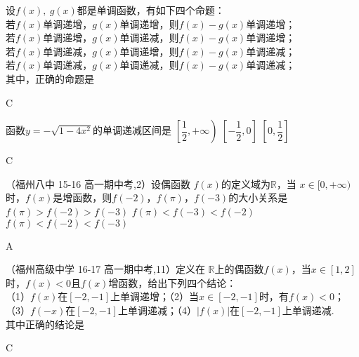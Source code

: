   \begin{exercise}
    \item
      设$f(x),\ g(x)$都是单调函数，有如下四个命题：\\
      若$f(x)$单调递增，$g(x)$单调递增，则$f(x)-g(x)$单调递增；\\
      若$f(x)$单调递增，$g(x)$单调递减，则$f(x)-g(x)$单调递增；\\
      若$f(x)$单调递减，$g(x)$单调递增，则$f(x)-g(x)$单调递减；\\
      若$f(x)$单调递减，$g(x)$单调递减，则$f(x)-g(x)$单调递减；\\
      其中，正确的命题是\xz
      \begin{answer}
        C
      \end{answer}
    \item
      函数$y=-\sqrt{1-4x^2}$的单调递减区间是\xz
      \xx{$\left(-\infty,\dfrac{1}2\right]$}
        {$\left[\dfrac{1}2,+\infty\right)$}
        {$\left[-\dfrac{1}2,0\right]$}
        {$\left[0,\dfrac{1}2\right]$}
      \begin{answer}
        C
      \end{answer}
    \item
      （福州八中 15-16 高一期中考,2）设偶函数 $f(x)$的定义域为$\mathbb{R}$，当 $x\in[0,+\infty)$时，$f(x)$是增函数，则$f(-2)$，$f(\pi)$，$f(-3)$的大小关系是\xz
          {$f(\pi)>f(-2)>f(-3)$}
          {$f(\pi)<f(-3)<f(-2)$}
          {$f(\pi)<f(-2)<f(-3)$}
      \begin{answer}
        A
      \end{answer}
    \item
      （福州高级中学 16-17 高一期中考,11）定义在 $\mathbb{R}$上的偶函数$f(x)$，当$x\in[1,2]$时，$f(x)<0$且$f(x)$增函数，给出下列四个结论：\\
      （1）$f(x)$在$[-2,-1]$上单调递增；\hspace{4em}（2）当$x\in[-2,-1]$时，有$f(x)<0$；\\
      （3）$f(-x)$在$[-2,-1]$上单调递减；\hspace{3.5em}（4）$|f(x)|$在$[-2,-1]$上单调递减.\\
      其中正确的结论是\xz
      \begin{answer}
        C
      \end{answer}
    \item

\end{exercise}
